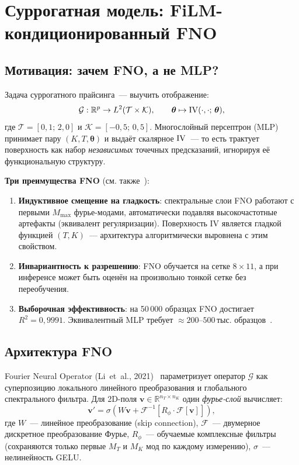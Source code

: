 
\section{Суррогатная модель: FiLM-кондиционированный FNO}
\label{sec:fno}

\subsection{Мотивация: зачем FNO, а не MLP?}

Задача суррогатного прайсинга~--- выучить отображение:
\[
  \mathcal{G}: \mathbb{R}^p \to L^2(\mathcal{T}\times\mathcal{K}),
  \qquad \boldsymbol{\theta} \mapsto \mathrm{IV}(\cdot,\cdot;\,\boldsymbol{\theta}),
\]
где $\mathcal{T} = [0{,}1;\,2{,}0]$ и $\mathcal{K} = [-0{,}5;\,0{,}5]$.
Многослойный персептрон (MLP) принимает пару $(K, T, \boldsymbol{\theta})$
и выдаёт скалярное $\mathrm{IV}$~--- то есть трактует поверхность как набор
\textit{независимых} точечных предсказаний, игнорируя её функциональную структуру.

\textbf{Три преимущества FNO} (см. также~\cite{Li2021}):
\begin{enumerate}
  \item \textbf{Индуктивное смещение на гладкость}: спектральные слои
        FNO работают с первыми $M_{\max}$ фурье-модами, автоматически
        подавляя высокочастотные артефакты (эквивалент регуляризации).
        Поверхность IV является гладкой функцией $(T,K)$~--- архитектура
        алгоритмически выровнена с этим свойством.
  \item \textbf{Инвариантность к разрешению}: FNO обучается на сетке
        $8\times11$, а при инференсе может быть оценён на произвольно
        тонкой сетке без переобучения.
  \item \textbf{Выборочная эффективность}: на 50\,000 образцах FNO достигает
        $R^2 = 0{,}9991$. Эквивалентный MLP требует $\approx 200$--$500$\,тыс.
        образцов~\cite{Horvath2021}.
\end{enumerate}

\subsection{Архитектура FNO}

Fourier Neural Operator (Li~et~al., 2021)~\cite{Li2021} параметризует оператор
$\mathcal{G}$ как суперпозицию локального линейного преобразования и
глобального спектрального фильтра. Для 2D-поля $\mathbf{v} \in \mathbb{R}^{n_T\times n_K}$
один \textit{фурье-слой} вычисляет:
\begin{equation}
  \label{eq:fno_layer}
  \mathbf{v}' = \sigma\!\left(
    W\mathbf{v}
    + \mathcal{F}^{-1}\!\left[R_\phi \cdot \mathcal{F}[\mathbf{v}]\right]
  \right),
\end{equation}
где $W$~--- линейное преобразование (skip connection), $\mathcal{F}$~---
двумерное дискретное преобразование Фурье, $R_\phi$~--- обучаемые комплексные
фильтры (сохраняются только первые $M_T$ и $M_K$ мод по каждому измерению),
$\sigma$~--- нелинейность GELU.

